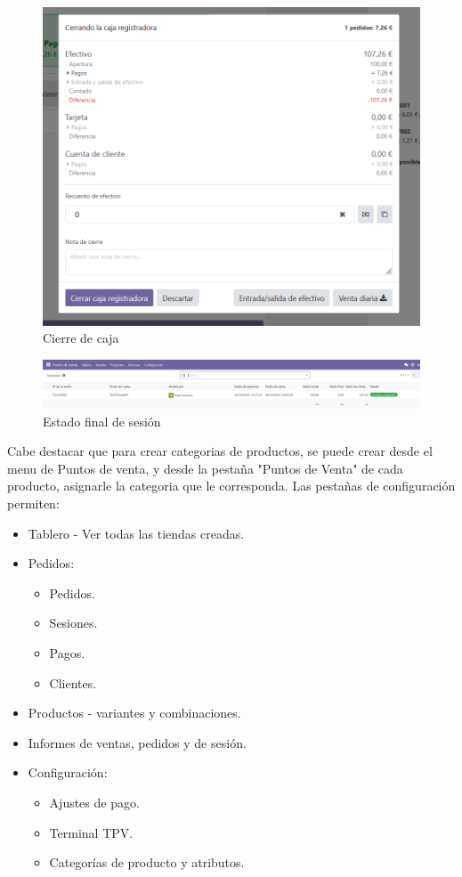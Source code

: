 \documentclass[a4paper,12pt]{article}
\begin{document}
\begin{figure}[h!]
    \centering
    \includegraphics[width=1\textwidth]{pr2odoo60-cierreCaja.png}
    \caption{Cierre de caja}
\end{figure}
\FloatBarrier

\begin{figure}[h!]
    \centering
    \includegraphics[width=1\textwidth]{pr2odoo61-estadoFinalSesion.png}
    \caption{Estado final de sesión}
\end{figure}
\FloatBarrier

Cabe destacar que para crear categorias de productos, se puede crear desde el menu de Puntos de venta, y desde la pestaña "Puntos de Venta" de cada producto, asignarle la categoria que le corresponda.
\clearpage
Las pestañas de configuración permiten:
\begin{itemize}
    \item Tablero - Ver todas las tiendas creadas.
    \item Pedidos:
    \begin{itemize}
        \item  Pedidos.
        \item  Sesiones.
        \item  Pagos.
        \item  Clientes.
    \end{itemize}
    \item Productos - variantes y combinaciones.
    \item Informes de ventas, pedidos y de sesión.
    \item Configuración:
    \begin{itemize}
        \item  Ajustes de pago.
        \item  Terminal TPV.
        \item  Categorías de producto y atributos.
    \end{itemize}
\end{itemize}
\end{document}

